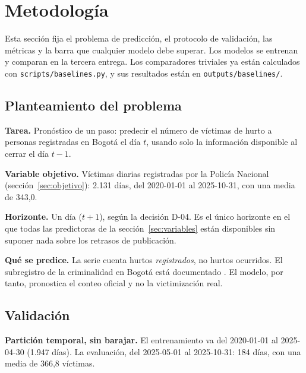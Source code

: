 
\section{Metodología}\label{sec:metodologia}

Esta sección fija el problema de predicción, el protocolo de validación, las métricas y la barra que cualquier modelo debe superar. Los modelos se entrenan y comparan en la tercera entrega. Los comparadores triviales ya están calculados con \texttt{scripts/baselines.py}, y sus resultados están en \texttt{outputs/baselines/}.

\subsection{Planteamiento del problema}\label{sec:problema}

\textbf{Tarea.} Pronóstico de un paso: predecir el número de víctimas de hurto a personas registradas en Bogotá el día $t$, usando solo la información disponible al cerrar el día $t-1$.

\textbf{Variable objetivo.} Víctimas diarias registradas por la Policía Nacional (sección~\ref{sec:objetivo}): 2.131 días, del 2020-01-01 al 2025-10-31, con una media de 343,0.

\textbf{Horizonte.} Un día ($t+1$), según la decisión D-04. Es el único horizonte en el que todas las predictoras de la sección~\ref{sec:variables} están disponibles sin suponer nada sobre los retrasos de publicación.

\textbf{Qué se predice.} La serie cuenta hurtos \emph{registrados}, no hurtos ocurridos. El subregistro de la criminalidad en Bogotá está documentado \citep{riascos2023}. El modelo, por tanto, pronostica el conteo oficial y no la victimización real.

\subsection{Validación}\label{sec:validacion}

\textbf{Partición temporal, sin barajar.} El entrenamiento va del 2020-01-01 al 2025-04-30 (1.947 días). La evaluación, del 2025-05-01 al 2025-10-31: 184 días, con una media de 366,8 víctimas.

